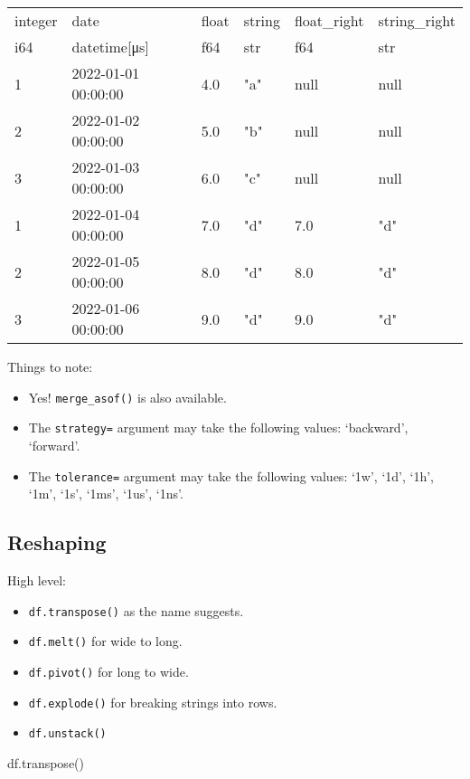 \documentclass[
  letterpaper,
  DIV=11,
  numbers=noendperiod]{scrartcl}
\newenvironment{Shaded}{\begin{snugshade}}{\end{snugshade}}
\newcommand{\NormalTok}[1]{\textcolor[rgb]{0.00,0.23,0.31}{#1}}
\providecommand{\tightlist}{%
  \setlength{\itemsep}{0pt}\setlength{\parskip}{0pt}}\usepackage{longtable,booktabs,array}
\begin{document}
\begin{longtable}[]{@{}llllll@{}}
\toprule()
integer & date & float & string & float\_right & string\_right \\
i64 & datetime{[}μs{]} & f64 & str & f64 & str \\
\midrule()
\endhead
1 & 2022-01-01 00:00:00 & 4.0 & "a" & null & null \\
2 & 2022-01-02 00:00:00 & 5.0 & "b" & null & null \\
3 & 2022-01-03 00:00:00 & 6.0 & "c" & null & null \\
1 & 2022-01-04 00:00:00 & 7.0 & "d" & 7.0 & "d" \\
2 & 2022-01-05 00:00:00 & 8.0 & "d" & 8.0 & "d" \\
3 & 2022-01-06 00:00:00 & 9.0 & "d" & 9.0 & "d" \\
\bottomrule()
\end{longtable}

Things to note:

\begin{itemize}
\tightlist
\item
  Yes! \texttt{merge\_asof()} is also available.
\item
  The \texttt{strategy=} argument may take the following values:
  `backward', `forward'.
\item
  The \texttt{tolerance=} argument may take the following values: `1w',
  `1d', `1h', `1m', `1s', `1ms', `1us', `1ns'.
\end{itemize}

\hypertarget{reshaping}{%
\subsection{Reshaping}\label{reshaping}}

High level:

\begin{itemize}
\tightlist
\item
  \texttt{df.transpose()} as the name suggests.
\item
  \texttt{df.melt()} for wide to long.
\item
  \texttt{df.pivot()} for long to wide.
\item
  \texttt{df.explode()} for breaking strings into rows.
\item
  \texttt{df.unstack()}
\end{itemize}

\begin{Shaded}
\begin{Highlighting}[]
\NormalTok{df.transpose()}
\end{Highlighting}
\end{Shaded}
\end{document}
